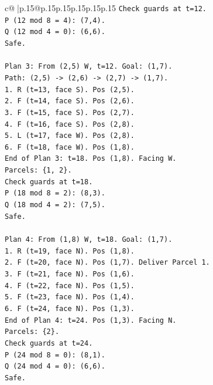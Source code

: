 \documentclass{article}
\begin{document}
{\begin{supertabular}{c@{$\;$}|p{.15\linewidth}@{}p{.15\linewidth}p{.15\linewidth}p{.15\linewidth}p{.15\linewidth}p{.15\linewidth}}
{{{\texttt{Check guards at t=12.} \\
\texttt{P (12 mod 8 = 4): (7,4).} \\
\texttt{Q (12 mod 4 = 0): (6,6).} \\
\texttt{Safe.} \\
\\ 
\texttt{Plan 3: From (2,5) W, t=12. Goal: (1,7).} \\
\texttt{Path: (2,5) {-}> (2,6) {-}> (2,7) {-}> (1,7).} \\
\texttt{1. R (t=13, face S). Pos (2,5).} \\
\texttt{2. F (t=14, face S). Pos (2,6).} \\
\texttt{3. F (t=15, face S). Pos (2,7).} \\
\texttt{4. F (t=16, face S). Pos (2,8).} \\
\texttt{5. L (t=17, face W). Pos (2,8).} \\
\texttt{6. F (t=18, face W). Pos (1,8).} \\
\texttt{End of Plan 3: t=18. Pos (1,8). Facing W.} \\
\texttt{Parcels: \{1, 2\}.} \\
\texttt{Check guards at t=18.} \\
\texttt{P (18 mod 8 = 2): (8,3).} \\
\texttt{Q (18 mod 4 = 2): (7,5).} \\
\texttt{Safe.} \\
\\ 
\texttt{Plan 4: From (1,8) W, t=18. Goal: (1,7).} \\
\texttt{1. R (t=19, face N). Pos (1,8).} \\
\texttt{2. F (t=20, face N). Pos (1,7). Deliver Parcel 1.} \\
\texttt{3. F (t=21, face N). Pos (1,6).} \\
\texttt{4. F (t=22, face N). Pos (1,5).} \\
\texttt{5. F (t=23, face N). Pos (1,4).} \\
\texttt{6. F (t=24, face N). Pos (1,3).} \\
\texttt{End of Plan 4: t=24. Pos (1,3). Facing N.} \\
\texttt{Parcels: \{2\}.} \\
\texttt{Check guards at t=24.} \\
\texttt{P (24 mod 8 = 0): (8,1).} \\
\texttt{Q (24 mod 4 = 0): (6,6).} \\
\texttt{Safe.} \\
\\ 
}}}
\end{supertabular}}
\end{document}
